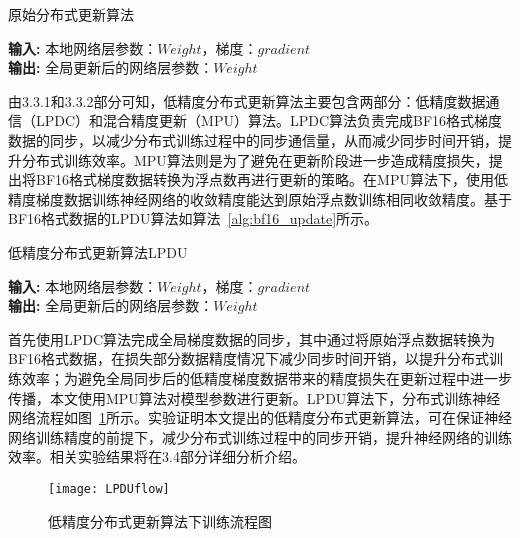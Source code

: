 \begin{algorithm}\small
\caption{原始分布式更新算法}
\textbf{输入:}
本地网络层参数：$Weight$，梯度：$gradient$ \\
\textbf{输出:} 
全局更新后的网络层参数：$Weight$
\begin{algorithmic}[1]
\end{algorithmic}
	\label{alg:fp32_update}
\end{algorithm}

由3.3.1和3.3.2部分可知，低精度分布式更新算法主要包含两部分：低精度数据通信（LPDC）和混合精度更新（MPU）算法。LPDC算法负责完成BF16格式梯度数据的同步，以减少分布式训练过程中的同步通信量，从而减少同步时间开销，提升分布式训练效率。MPU算法则是为了避免在更新阶段进一步造成精度损失，提出将BF16格式梯度数据转换为浮点数再进行更新的策略。在MPU算法下，使用低精度梯度数据训练神经网络的收敛精度能达到原始浮点数训练相同收敛精度。基于BF16格式数据的LPDU算法如算法~\ref{alg:bf16_update}所示。

\begin{algorithm}\small
\caption{低精度分布式更新算法LPDU}
\textbf{输入:}
本地网络层参数：$Weight$，梯度：$gradient$ \\
\textbf{输出:} 
全局更新后的网络层参数：$Weight$
\begin{algorithmic}[1]
\end{algorithmic}
	\label{alg:bf16_update}
\end{algorithm}

首先使用LPDC算法完成全局梯度数据的同步，其中通过将原始浮点数据转换为BF16格式数据，在损失部分数据精度情况下减少同步时间开销，以提升分布式训练效率；为避免全局同步后的低精度梯度数据带来的精度损失在更新过程中进一步传播，本文使用MPU算法对模型参数进行更新。LPDU算法下，分布式训练神经网络流程如图~\ref{fig:LPDUflow}所示。实验证明本文提出的低精度分布式更新算法，可在保证神经网络训练精度的前提下，减少分布式训练过程中的同步开销，提升神经网络的训练效率。相关实验结果将在3.4部分详细分析介绍。

\begin{figure}[htp]
\centering
\texttt{[image: LPDUflow]}
\caption{低精度分布式更新算法下训练流程图}
\label{fig:LPDUflow}
\end{figure}

